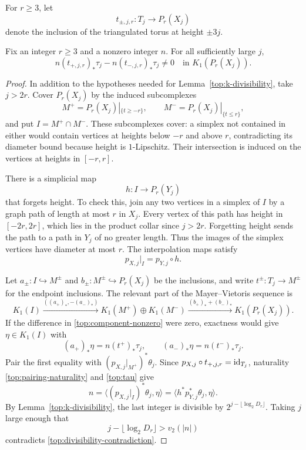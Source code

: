For $r\geq3$, let
\[
 t_{\pm,j,r}:T_j\longrightarrow P_r(X_j)
\]
denote the inclusion of the triangulated torus at height $\pm3j$.

\begin{lemma}
\label{top:component-detection}
Fix an integer $r\geq3$ and a nonzero integer $n$. For all sufficiently
large $j$,
\begin{equation}
 n(t_{+,j,r})_*\tau_j-n(t_{-,j,r})_*\tau_j
 \neq0\quad\text{in }K_1(P_r(X_j)).
 \label{top:component-nonzero}
\end{equation}
\end{lemma}

\begin{proof}
In addition to the hypotheses needed for
Lemma~\ref{top:k-divisibility}, take $j>2r$. Cover $P_r(X_j)$ by the
induced subcomplexes
\[
 M^+=P_r(X_j)|_{\{t\geq-r\}},\qquad
 M^-=P_r(X_j)|_{\{t\leq r\}},
\]
and put $I=M^+\cap M^-$. These subcomplexes cover: a simplex not
contained in either would contain vertices at heights below $-r$ and
above $r$, contradicting its diameter bound because height is
$1$-Lipschitz. Their intersection is induced on the vertices at heights
in $[-r,r]$.

There is a simplicial map
\[
 h:I\longrightarrow P_r(Y_j)
\]
that forgets height. To check this, join any two vertices in a simplex
of $I$ by a graph path of length at most $r$ in $X_j$. Every vertex of
this path has height in $[-2r,2r]$, which lies in the product collar
since $j>2r$. Forgetting height sends the path to a path in $Y_j$ of
no greater length. Thus the images of the simplex vertices have
diameter at most $r$. The interpolation maps satisfy
\begin{equation}
 p_{X,j}|_I=p_{Y,j}\circ h.
 \label{top:collar-factorization}
\end{equation}

Let $a_\pm:I\hookrightarrow M^\pm$ and
$b_\pm:M^\pm\hookrightarrow P_r(X_j)$ be the inclusions, and write
$t^\pm:T_j\to M^\pm$ for the endpoint inclusions. The relevant part of
the Mayer--Vietoris sequence is
\[
 K_1(I)\xrightarrow{((a_+)_*,-(a_-)_*)}
 K_1(M^+)\oplus K_1(M^-)
 \xrightarrow{(b_+)_*+(b_-)_*}K_1(P_r(X_j)).
\]
If the difference in \eqref{top:component-nonzero} were zero,
exactness would give $\eta\in K_1(I)$ with
\[
 (a_+)_*\eta=n(t^+)_*\tau_j,
 \qquad (a_-)_*\eta=n(t^-)_*\tau_j.
\]
Pair the first equality with $(p_{X,j}|_{M^+})^*\theta_j$. Since
$p_{X,j}\circ t_{+,j,r}=\operatorname{id}_{T_j}$, naturality
\eqref{top:pairing-naturality} and \eqref{top:tau} give
\begin{equation}
 n
 =\langle(p_{X,j}|_I)^*\theta_j,\eta\rangle
 =\langle h^*p_{Y,j}^*\theta_j,\eta\rangle.
 \label{top:divisibility-contradiction}
\end{equation}
By Lemma~\ref{top:k-divisibility}, the last integer is divisible by
$2^{j-\lfloor\log_2D_r\rfloor}$. Taking $j$ large enough that
\[
 j-\lfloor\log_2D_r\rfloor>v_2(|n|)
\]
contradicts \eqref{top:divisibility-contradiction}.
\end{proof}

